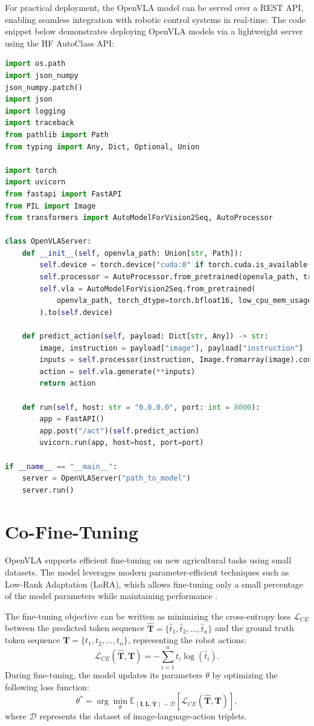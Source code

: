 For practical deployment, the OpenVLA model can be served over a REST API, enabling seamless integration with robotic control systems in real-time. The code snippet below demonstrates deploying OpenVLA models via a lightweight server using the HF AutoClass API:

\begin{lstlisting}[language=Python, caption=OpenVLA Deployment Server Example]
import os.path
import json_numpy
json_numpy.patch()
import json
import logging
import traceback
from pathlib import Path
from typing import Any, Dict, Optional, Union

import torch
import uvicorn
from fastapi import FastAPI
from PIL import Image
from transformers import AutoModelForVision2Seq, AutoProcessor

class OpenVLAServer:
    def __init__(self, openvla_path: Union[str, Path]):
        self.device = torch.device("cuda:0" if torch.cuda.is_available() else "cpu")
        self.processor = AutoProcessor.from_pretrained(openvla_path, trust_remote_code=True)
        self.vla = AutoModelForVision2Seq.from_pretrained(
            openvla_path, torch_dtype=torch.bfloat16, low_cpu_mem_usage=True, trust_remote_code=True
        ).to(self.device)

    def predict_action(self, payload: Dict[str, Any]) -> str:
        image, instruction = payload["image"], payload["instruction"]
        inputs = self.processor(instruction, Image.fromarray(image).convert("RGB")).to(self.device, dtype=torch.bfloat16)
        action = self.vla.generate(**inputs)
        return action

    def run(self, host: str = "0.0.0.0", port: int = 8000):
        app = FastAPI()
        app.post("/act")(self.predict_action)
        uvicorn.run(app, host=host, port=port)

if __name__ == "__main__":
    server = OpenVLAServer("path_to_model")
    server.run()
\end{lstlisting}

\section{Co-Fine-Tuning}
OpenVLA supports efficient fine-tuning on new agricultural tasks using small datasets. The model leverages modern parameter-efficient techniques such as Low-Rank Adaptation (LoRA), which allows fine-tuning only a small percentage of the model parameters while maintaining performance \cite{hu2021lora}. 

The fine-tuning objective can be written as minimizing the cross-entropy loss $\mathcal{L}_{CE}$ between the predicted token sequence $\hat{\mathbf{T}} = \{\hat{t}_1, \hat{t}_2, \dots, \hat{t}_n\}$ and the ground truth token sequence $\mathbf{T} = \{t_1, t_2, \dots, t_n\}$, representing the robot actions:
\[
\mathcal{L}_{CE}(\hat{\mathbf{T}}, \mathbf{T}) = -\sum_{i=1}^{n} t_i \log(\hat{t}_i).
\]
During fine-tuning, the model updates its parameters $\theta$ by optimizing the following loss function:
\[
\theta^* = \arg \min_\theta \mathbb{E}_{(\mathbf{I}, \mathbf{L}, \mathbf{T}) \sim \mathcal{D}} \left[\mathcal{L}_{CE}(\hat{\mathbf{T}}, \mathbf{T})\right],
\]
where $\mathcal{D}$ represents the dataset of image-language-action triplets.

